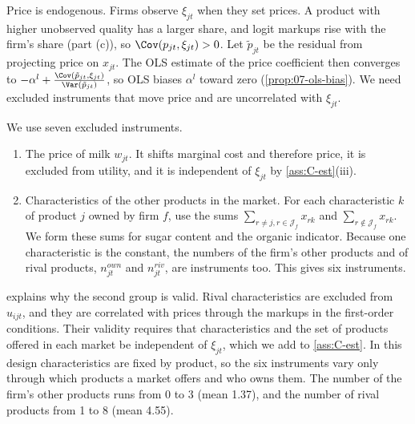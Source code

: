 Price is endogenous. Firms observe $\xi_{jt}$ when they set prices. A product with higher unobserved quality has a
larger share, and logit markups rise with the firm's share (part (c)), so $\Cov(p_{jt}, \xi_{jt}) > 0$. Let
$\tilde p_{jt}$ be the residual from projecting price on $x_{jt}$. The OLS estimate of the price coefficient then converges
to $-\alpha^l + \frac{\Cov(\tilde p_{jt}, \xi_{jt})}{\Var(\tilde p_{jt})}$, so OLS biases $\alpha^l$ toward zero
(\cref{prop:07-ols-bias}). We need excluded instruments that move price and are uncorrelated with $\xi_{jt}$.

We use seven excluded instruments.
\begin{enumerate}
  \item The price of milk $w_{jt}$. It shifts marginal cost and therefore price, it is excluded from utility, and it is
  independent of $\xi_{jt}$ by \cref{ass:C-est}(iii).
  \item Characteristics of the other products in the market. For each characteristic $k$ of product $j$ owned by firm $f$,
  \citet[eq.~5.8, p.~861]{BerryLevinsohnPakes1995} use the sums $\sum_{r \ne j, r \in \mathcal{J}_f}x_{rk}$ and
  $\sum_{r \notin \mathcal{J}_f}x_{rk}$. We form these sums for sugar content and the organic indicator. Because one
  characteristic is the constant, the numbers of the firm's other products and of rival products, $n^{own}_{jt}$ and
  $n^{riv}_{jt}$, are instruments too. This gives six instruments.
\end{enumerate}
\citet[p.~249]{Berry1994} explains why the second group is valid. Rival characteristics are excluded from $u_{ijt}$, and
they are correlated with prices through the markups in the first-order conditions. Their validity requires that
characteristics and the set of products offered in each market be independent of $\xi_{jt}$, which we add to
\cref{ass:C-est}. In this design characteristics are fixed by product, so the six instruments vary only through
which products a market offers and who owns them. The number of the firm's other products runs from 0 to 3 (mean 1.37),
and the number of rival products from 1 to 8 (mean 4.55).

